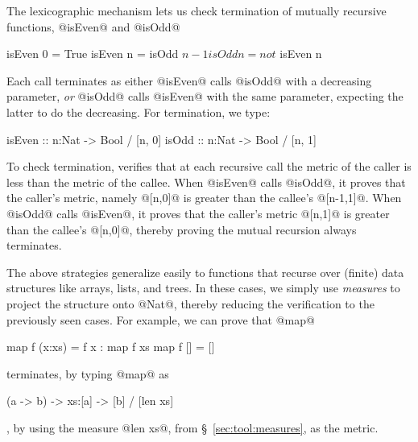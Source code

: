%
The lexicographic mechanism lets us check termination of
mutually recursive functions, \eg @isEven@ and @isOdd@
%
\begin{code}
  isEven 0 = True
  isEven n = isOdd $ n-1
  
  isOdd n  = not $ isEven n 
\end{code}
%
Each call terminates as either @isEven@ calls @isOdd@ with a 
decreasing parameter, \emph{or} @isOdd@ calls @isEven@ with 
the same parameter, expecting the latter to do the decreasing.
%
For termination, we type:
%
\begin{code}
  isEven :: n:Nat -> Bool / [n, 0]
  isOdd  :: n:Nat -> Bool / [n, 1]
\end{code}
%
To check termination, \toolname verifies that at each recursive 
call the metric of the caller is less than the metric of the 
callee.
%
When @isEven@ calls @isOdd@, it proves that the caller's 
metric, namely @[n,0]@ is greater than the callee's @[n-1,1]@.
When \hbox{@isOdd@} calls @isEven@, it proves that the 
caller's metric @[n,1]@ is greater than the callee's @[n,0]@,
thereby proving the mutual recursion always terminates.

The above strategies generalize easily to functions that recurse
over (finite) data structures like arrays, lists, and trees.
In these cases, we simply use \emph{measures} to project the 
structure onto @Nat@, thereby reducing the verification to 
the previously seen cases. 
For example, we can prove that @map@ 
%
\begin{code}
  map f (x:xs) = f x : map f xs
  map f []     = []
\end{code}
%
terminates, by typing @map@ as 
%
\begin{code}
  (a -> b) -> xs:[a] -> [b] / [len xs]
\end{code}
%
\ie, by using the measure @len xs@, from \S~\ref{sec:tool:measures}, 
as the metric.


